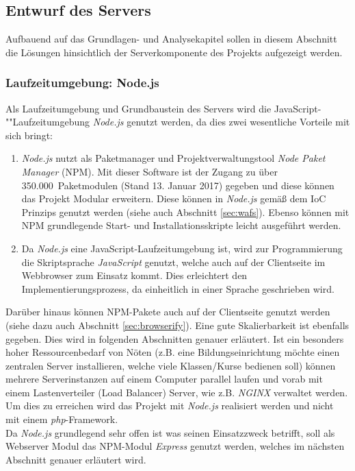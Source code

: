 \subsection{Entwurf des Servers}\label{sec:serverkonzept}
Aufbauend auf das Grundlagen- und Analysekapitel sollen in diesem Abschnitt die Lösungen hinsichtlich der Serverkomponente des Projekts aufgezeigt werden. 
\subsubsection{Laufzeitumgebung: Node.js}\label{sec:nodejs}
Als Laufzeitumgebung und Grundbaustein des Servers wird die JavaScript-""Laufzeitumgebung \emph{Node.js} \cite{Node.js} genutzt werden, da dies zwei wesentliche Vorteile mit sich bringt:
\begin{enumerate}
	\item \emph{Node.js} nutzt als Paketmanager und Projektverwaltungstool \emph{Node Paket Manager} (NPM). Mit dieser Software ist der Zugang zu über 350.000~Paketmodulen (Stand 13. Januar 2017) \cite{npm2017} gegeben und diese können das Projekt Modular erweitern. Diese können in \emph{Node.js} gemäß dem IoC Prinzips genutzt werden (siehe auch Abschnitt \ref{sec:wafs}). 
	Ebenso können mit NPM grundlegende Start- und Installationsskripte leicht ausgeführt werden. 
	\item Da \emph{Node.js} eine JavaScript-Laufzeitumgebung ist, wird zur Programmierung die Skriptsprache \emph{JavaScript} genutzt, welche auch auf der Clientseite im Webbrowser zum Einsatz kommt. Dies erleichtert den Implementierungsprozess, da einheitlich in einer Sprache geschrieben wird.
\end{enumerate}
Darüber hinaus können NPM-Pakete auch auf der Clientseite genutzt werden (siehe dazu auch Abschnitt \ref{sec:browserify}). Eine gute Skalierbarkeit ist ebenfalls gegeben. Dies wird in folgenden Abschnitten genauer erläutert. Ist ein besonders hoher Ressourcenbedarf von Nöten (z.B. eine Bildungseinrichtung möchte einen zentralen Server installieren, welche viele Klassen/Kurse bedienen soll) können mehrere Serverinstanzen auf einem Computer parallel laufen und vorab mit einem Lastenverteiler (Load Balancer) Server, wie z.B. \emph{NGINX} verwaltet werden. Um dies zu erreichen wird das Projekt mit \emph{Node.js} realisiert werden und nicht mit einem \emph{php}-Framework. \\ Da \emph{Node.js} grundlegend sehr offen ist was seinen Einsatzzweck betrifft, soll als Webserver Modul das NPM-Modul \emph{Express} genutzt werden, welches im nächsten Abschnitt genauer erläutert wird.
